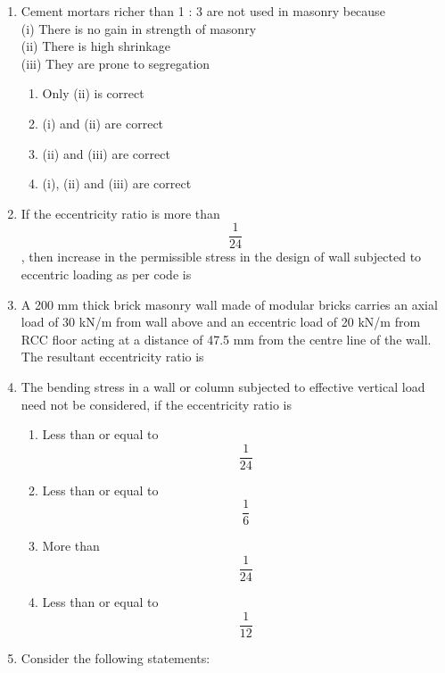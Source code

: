 \documentclass[11pt,a4paper]{article}
\begin{document}
\begin{enumerate}
{}
\\
\item{Cement mortars richer than 1 : 3 are not used in masonry because \\
(i) There is no gain in strength of masonry \\
(ii) There is high shrinkage \\
(iii) They are prone to segregation}
\begin{enumerate}[label=\Alph*.]
\item{Only (ii) is correct}
\item{(i) and (ii) are correct}
\item{(ii) and (iii) are correct}
\item{(i), (ii) and (iii) are correct}
\end{enumerate}
\item{If the eccentricity ratio is more than $$\frac{1}{{24}}$$, then increase in the permissible stress in the design of wall subjected to eccentric loading as per code is}
\\
\item{A 200 mm thick brick masonry wall made of modular bricks carries an axial load of 30 kN/m from wall above and an eccentric load of 20 kN/m from RCC floor acting at a distance of 47.5 mm from the centre line of the wall. The resultant eccentricity ratio is}
\\
\item{The bending stress in a wall or column subjected to effective vertical load need not be considered, if the eccentricity ratio is}
\begin{enumerate}[label=\Alph*.]
\item{Less than or equal to $$\frac{1}{{24}}$$}
\item{Less than or equal to $$\frac{1}{6}$$}
\item{More than $$\frac{1}{{24}}$$}
\item{Less than or equal to $$\frac{1}{{12}}$$}
\end{enumerate}
\item{Consider the following statements: \\

}
\end{enumerate}
\end{document}
